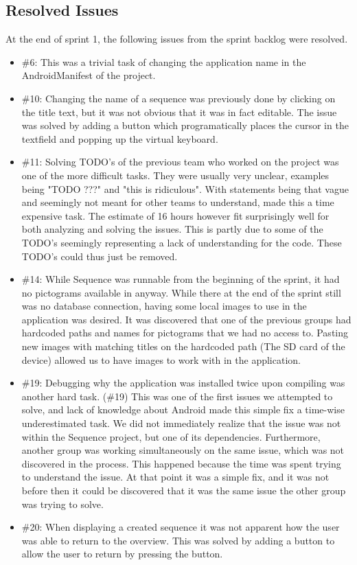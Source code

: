 \subsection{Resolved Issues} \label{subsec:spr1_resolved_issues}

At the end of sprint 1, the following issues from the sprint backlog were resolved.
\begin{itemize}
\item \#6: This was a trivial task of changing the application name in the AndroidManifest of the project.
\item \#10: Changing the name of a sequence was previously done by clicking on the title text, but it was not obvious that it was in fact editable. The issue was solved by adding a button which programatically places the cursor in the textfield and popping up the virtual keyboard.
\item \#11: Solving TODO's of the previous team who worked on the project was one of the more difficult tasks. They were usually very unclear, examples being "TODO ???" and "this is ridiculous". With statements being that vague and seemingly not meant for other teams to understand, made this a time expensive task. The estimate of 16 hours however fit surprisingly well for both analyzing and solving the issues. This is partly due to some of the TODO's seemingly representing a lack of understanding for the code. These TODO's could thus just be removed.
\item \#14: While Sequence was runnable from the beginning of the sprint, it had no pictograms available in anyway. While there at the end of the sprint still was no database connection, having some local images to use in the application was desired. It was discovered that one of the previous groups had hardcoded paths and names for pictograms that we had no access to. Pasting new images with matching titles on the hardcoded path (The SD card of the device) allowed us to have images to work with in the application.
\item \#19: Debugging why the application was installed twice upon compiling was another hard task. (\#19) This was one of the first issues we attempted to solve, and lack of knowledge about Android made this simple fix a time-wise underestimated task. We did not immediately realize that the issue was not within the Sequence project, but one of its dependencies. Furthermore, another group was working simultaneously on the same issue, which was not discovered in the process. This happened because the time was spent trying to understand the issue. At that point it was a simple fix, and it was not before then it could be discovered that it was the same issue the other group was trying to solve.
\item \#20: When displaying a created sequence it was not apparent how the user was able to return to the overview. This was solved by adding a button to allow the user to return by pressing the button.
\end{itemize}